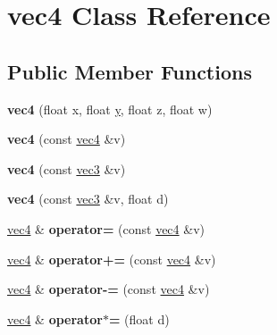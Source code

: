 \hypertarget{classvec4}{\section{vec4 Class Reference}
\label{classvec4}
}
\subsection*{Public Member Functions}
\begin{DoxyCompactItemize}
\item 
\hypertarget{classvec4_a4174b718621ba5b473ea2c289f11fe46}{{\bfseries vec4} (float x, float \hyperlink{_ice_utils_8h_aa7ffaed69623192258fb8679569ff9ba}{y}, float z, float w)}\label{classvec4_a4174b718621ba5b473ea2c289f11fe46}

\item 
\hypertarget{classvec4_acccb915903f97605879d62049357c2b4}{{\bfseries vec4} (const \hyperlink{classvec4}{vec4} \&v)}\label{classvec4_acccb915903f97605879d62049357c2b4}

\item 
\hypertarget{classvec4_a977090532e2baca5d9b0affd029fab7d}{{\bfseries vec4} (const \hyperlink{classvec3}{vec3} \&v)}\label{classvec4_a977090532e2baca5d9b0affd029fab7d}

\item 
\hypertarget{classvec4_a38decce62d3631caf397b90078a39d64}{{\bfseries vec4} (const \hyperlink{classvec3}{vec3} \&v, float d)}\label{classvec4_a38decce62d3631caf397b90078a39d64}

\item 
\hypertarget{classvec4_aed2a473c8d724973efb4ede93a2a5e95}{\hyperlink{classvec4}{vec4} \& {\bfseries operator=} (const \hyperlink{classvec4}{vec4} \&v)}\label{classvec4_aed2a473c8d724973efb4ede93a2a5e95}

\item 
\hypertarget{classvec4_a16d10f2ed44304fb1309f959f245ca52}{\hyperlink{classvec4}{vec4} \& {\bfseries operator+=} (const \hyperlink{classvec4}{vec4} \&v)}\label{classvec4_a16d10f2ed44304fb1309f959f245ca52}

\item 
\hypertarget{classvec4_a88f2ead88470beaa5204573d3862166e}{\hyperlink{classvec4}{vec4} \& {\bfseries operator-\/=} (const \hyperlink{classvec4}{vec4} \&v)}\label{classvec4_a88f2ead88470beaa5204573d3862166e}

\item 
\hypertarget{classvec4_a43918272bd61e5f8057de4a1ec0bd254}{\hyperlink{classvec4}{vec4} \& {\bfseries operator$\ast$=} (float d)}\label{classvec4_a43918272bd61e5f8057de4a1ec0bd254}


\end{DoxyCompactItemize}
